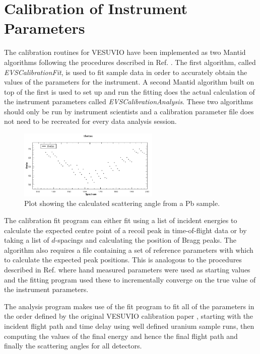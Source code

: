 \documentclass[paper=a4, fontsize=11pt]{scrartcl}	%
\numberwithin{equation}{section}															%
\numberwithin{figure}{section}																%
\numberwithin{table}{section}
\begin{document}
\section{Calibration of Instrument Parameters}
\label{sec:calibration}
The calibration routines for VESUVIO have been implemented as two Mantid algorithms following the procedures described in Ref. \cite{mayers2011calibration}. The first algorithm, called \textit{EVSCalibrationFit}, is used to fit sample data in order to accurately obtain the values of the parameters for the instrument. A second Mantid algorithm built on top of the first is used to set up and run the fitting does the actual calculation of the instrument parameters called \textit{EVSCalibrationAnalysis}. These two algorithms should only be run by instrument scientists and a calibration parameter file does not need to be recreated for every data analysis session.


\begin{figure}[H]
\centering
\includegraphics[width=0.6\textwidth]{img/calib-theta.png}
\caption{Plot showing the calculated scattering angle from a Pb sample.}
\label{fig:calib-theta}
\end{figure}

The calibration fit program can either fit using a list of incident energies to calculate the expected centre point of a recoil peak in time-of-flight data or by taking a list of $d$-spacings and calculating the position of Bragg peaks. The algorithm also requires a file containing a set of reference parameters with which to calculate the expected peak positions. This is analogous to the procedures described in Ref. \cite{mayers2011calibration} where hand measured parameters were used as starting values and the fitting program used these to incrementally converge on the true value of the instrument parameters.

The analysis program makes use of the fit program to fit all of the parameters in the order defined by the original VESUVIO calibration paper \cite{mayers2011calibration}, starting with the incident flight path and time delay using well defined uranium sample runs, then computing the values of the final energy and hence the final flight path and finally the scattering angles for all detectors.
\end{document}
